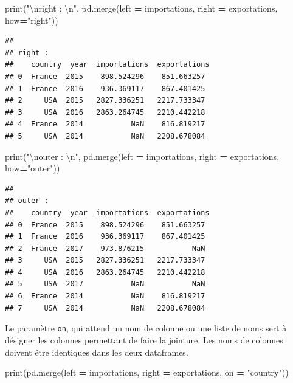 \documentclass[12pt,]{book}
\newenvironment{Shaded}{\begin{snugshade}}{\end{snugshade}}
\newcommand{\CharTok}[1]{\textcolor[rgb]{0.31,0.60,0.02}{#1}}
\newcommand{\StringTok}[1]{\textcolor[rgb]{0.31,0.60,0.02}{#1}}
\newcommand{\OperatorTok}[1]{\textcolor[rgb]{0.81,0.36,0.00}{\textbf{#1}}}
\newcommand{\BuiltInTok}[1]{#1}
\newcommand{\NormalTok}[1]{#1}
\numberwithin{equation}{section}
\numberwithin{countremarque}{section}
\begin{document}
\begin{Shaded}
\begin{Highlighting}[]
\BuiltInTok{print}\NormalTok{(}\StringTok{"}\CharTok{\textbackslash{}n}\StringTok{right : }\CharTok{\textbackslash{}n}\StringTok{"}\NormalTok{, pd.merge(left }\OperatorTok{=}\NormalTok{ importations, right }\OperatorTok{=}\NormalTok{ exportations, how}\OperatorTok{=}\StringTok{"right"}\NormalTok{))}
\end{Highlighting}
\end{Shaded}

\begin{lstlisting}
## 
## right : 
##    country  year  importations  exportations
## 0  France  2015    898.524296    851.663257
## 1  France  2016    936.369117    867.401425
## 2     USA  2015   2827.336251   2217.733347
## 3     USA  2016   2863.264745   2210.442218
## 4  France  2014           NaN    816.819217
## 5     USA  2014           NaN   2208.678084
\end{lstlisting}

\begin{Shaded}
\begin{Highlighting}[]
\BuiltInTok{print}\NormalTok{(}\StringTok{"}\CharTok{\textbackslash{}n}\StringTok{outer : }\CharTok{\textbackslash{}n}\StringTok{"}\NormalTok{, pd.merge(left }\OperatorTok{=}\NormalTok{ importations, right }\OperatorTok{=}\NormalTok{ exportations, how}\OperatorTok{=}\StringTok{"outer"}\NormalTok{))}
\end{Highlighting}
\end{Shaded}

\begin{lstlisting}
## 
## outer : 
##    country  year  importations  exportations
## 0  France  2015    898.524296    851.663257
## 1  France  2016    936.369117    867.401425
## 2  France  2017    973.876215           NaN
## 3     USA  2015   2827.336251   2217.733347
## 4     USA  2016   2863.264745   2210.442218
## 5     USA  2017           NaN           NaN
## 6  France  2014           NaN    816.819217
## 7     USA  2014           NaN   2208.678084
\end{lstlisting}

Le paramètre \texttt{on}, qui attend un nom de colonne ou une liste de
noms sert à désigner les colonnes permettant de faire la jointure. Les
noms de colonnes doivent être identiques dans les deux dataframes.

\begin{Shaded}
\begin{Highlighting}[]
\BuiltInTok{print}\NormalTok{(pd.merge(left }\OperatorTok{=}\NormalTok{ importations, right }\OperatorTok{=}\NormalTok{ exportations, on }\OperatorTok{=} \StringTok{"country"}\NormalTok{))}
\end{Highlighting}
\end{Shaded}
\end{document}
